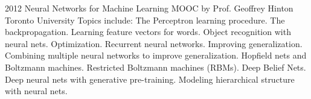 \documentclass[11pt,a4paper]{moderncv}
\begin{document}
\cventry                                                                                                          %
    {2012}                                                                                                        %
    {Neural Networks for Machine Learning}                                                                        %
    {MOOC by Prof. Geoffrey Hinton}                                                                               %
    {Toronto University}                                                                                          %
    {}                                                                                                            %
    {                                                                                                             %
        Topics include:                                                                                           %
            The Perceptron learning procedure.                                                                    %
            The backpropagation.                                                                                  %
            Learning feature vectors for words.                                                                   %
            Object recognition with neural nets.                                                                  %
            Optimization.                                                                                         %
            Recurrent neural networks.                                                                            %
            Improving generalization.                                                                             %
            Combining multiple neural networks to improve generalization.                                         %
            Hopfield nets and Boltzmann machines.                                                                 %
            Restricted Boltzmann machines (RBMs).                                                                 %
            Deep Belief Nets.                                                                                     %
            Deep neural nets with generative pre-training.                                                        %
            Modeling hierarchical structure with neural nets.                                                     %
    }                                                                                                             %
\end{document}
